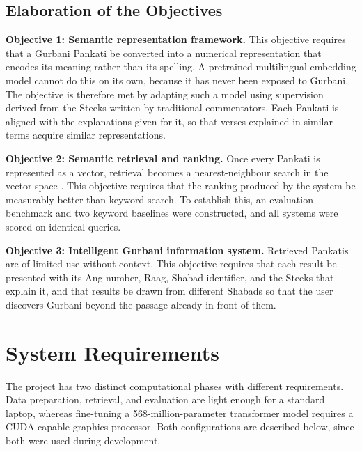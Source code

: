 \documentclass[12pt,a4paper]{article}
\begin{document}
\subsection{Elaboration of the Objectives}

\noindent\textbf{Objective 1: Semantic representation framework.}
This objective requires that a Gurbani Pankati be converted into a numerical representation that encodes its meaning rather than its spelling. A pretrained multilingual embedding model \cite{chen2024bgem3} cannot do this on its own, because it has never been exposed to Gurbani. The objective is therefore met by adapting such a model using supervision derived from the Steeks written by traditional commentators. Each Pankati is aligned with the explanations given for it, so that verses explained in similar terms acquire similar representations.

\vspace{0.3cm}

\noindent\textbf{Objective 2: Semantic retrieval and ranking.}
Once every Pankati is represented as a vector, retrieval becomes a nearest-neighbour search in the vector space \cite{karpukhin2020dpr, douze2024faiss}. This objective requires that the ranking produced by the system be measurably better than keyword search. To establish this, an evaluation benchmark and two keyword baselines were constructed, and all systems were scored on identical queries.

\vspace{0.3cm}

\noindent\textbf{Objective 3: Intelligent Gurbani information system.}
Retrieved Pankatis are of limited use without context. This objective requires that each result be presented with its Ang number, Raag, Shabad identifier, and the Steeks that explain it, and that results be drawn from different Shabads so that the user discovers Gurbani beyond the passage already in front of them.



\newpage
\section{System Requirements}

The project has two distinct computational phases with different requirements. Data preparation, retrieval, and evaluation are light enough for a standard laptop, whereas fine-tuning a 568-million-parameter transformer model requires a CUDA-capable graphics processor. Both configurations are described below, since both were used during development.
\end{document}

